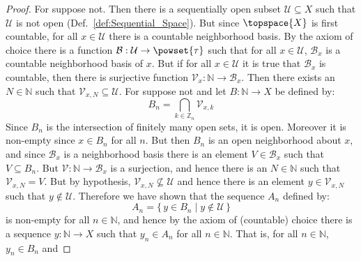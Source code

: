 \documentclass{article}                                                        %
\begin{document}
            \begin{proof}
                For suppose not. Then there is a sequentially open subset
                $\mathcal{U}\subseteq{X}$ such that $\mathcal{U}$ is not open
                (Def.~\ref{def:Sequential_Space}). But since $\topspace{X}$ is first
                countable, for all $x\in\mathcal{U}$ there is a countable
                neighborhood basis. By the axiom of choice there is a
                function $\mathcal{B}:\mathcal{U}\rightarrow\powset{\tau}$ such that
                for all $x\in\mathcal{U}$, $\mathcal{B}_{x}$ is a countable
                neighborhood basis of $x$. But if for all $x\in\mathcal{U}$ it is
                true that $\mathcal{B}_{x}$ is countable, then there is surjective
                function $\mathcal{V}_{x}:\mathbb{N}\rightarrow\mathcal{B}_{x}$.
                Then there exists an $N\in\mathbb{N}$ such that
                $\mathcal{V}_{x,N}\subseteq\mathcal{U}$. For suppose not and let
                $B:\mathbb{N}\rightarrow{X}$ be defined by:
                \begin{equation}
                    B_{n}=\bigcap_{k\in\mathbb{Z}_{n}}\mathcal{V}_{x,k}
                \end{equation}
                Since $B_{n}$ is the intersection of finitely many open sets, it is
                open. Moreover it is non-empty since $x\in{B}_{n}$ for all $n$.
                But then $B_{n}$ is an open neighborhood about $x$, and since
                $\mathcal{B}_{x}$ is a neighborhood basis there is an element
                $V\in\mathcal{B}_{x}$ such that $V\subseteq{B}_{n}$. But
                $\mathcal{V}:\mathbb{N}\rightarrow\mathcal{B}_{x}$ is a surjection,
                and hence there is an $N\in\mathbb{N}$ such that
                $\mathcal{V}_{x,N}=V$. But by hypothesis,
                $\mathcal{V}_{x,N}\nsubseteq\mathcal{U}$ and hence there is an
                element $y\in\mathcal{V}_{x,N}$ such that $y\notin\mathcal{U}$.
                Therefore we have shown that the sequence $A_{n}$ defined by:
                \begin{equation}
                    A_{n}=\{\,y\in{B}_{n}\;|\;y\not\in\mathcal{U}\,\}
                \end{equation}
                is non-empty for all $n\in\mathbb{N}$, and hence by the axiom of
                (countable) choice there is a sequence $y:\mathbb{N}\rightarrow{X}$
                such that $y_{n}\in{A}_{n}$ for all $n\in\mathbb{N}$. That is,
                for all $n\in\mathbb{N}$, $y_{n}\in{B}_{n}$ and

\end{proof}
\end{document}
